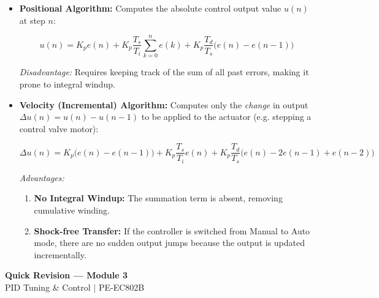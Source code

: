 \documentclass[12pt,a4paper]{article}
\begin{document}
\begin{itemize}[leftmargin=*, itemsep=2.5pt]
  \item \textbf{Positional Algorithm:} Computes the absolute control output value $u(n)$ at step $n$:
  \begin{tcolorbox}[formulabox, title={\textbf{Positional Digital PID}}]
  \[
  u(n) = K_p e(n) + K_p \frac{T_s}{T_i} \sum_{k=0}^n e(k) + K_p \frac{T_d}{T_s} \big( e(n) - e(n-1) \big)
  \]
  \end{tcolorbox}
  \textit{Disadvantage:} Requires keeping track of the sum of all past errors, making it prone to integral windup.
  
  \item \textbf{Velocity (Incremental) Algorithm:} Computes only the \textit{change} in output $\Delta u(n) = u(n) - u(n-1)$ to be applied to the actuator (e.g. stepping a control valve motor):
  \begin{tcolorbox}[formulabox, title={\textbf{Velocity Digital PID}}]
  \[
  \Delta u(n) = K_p \big( e(n) - e(n-1) \big) + K_p \frac{T_s}{T_i} e(n) + K_p \frac{T_d}{T_s} \big( e(n) - 2e(n-1) + e(n-2) \big)
  \]
  \end{tcolorbox}
  \textit{Advantages:}
  \begin{enumerate}[label=\textbf{\arabic*.}, leftmargin=*]
    \item \textbf{No Integral Windup:} The summation term is absent, removing cumulative winding.
    \item \textbf{Shock-free Transfer:} If the controller is switched from Manual to Auto mode, there are no sudden output jumps because the output is updated incrementally.
  \end{enumerate}
\end{itemize}

\newpage

\begin{center}
  {\large\bfseries\color{myred} Quick Revision --- Module 3}\\[3pt]
  {\small\color{mydark} PID Tuning \& Control $|$ PE-EC802B}
\end{center}
\noindent{\color{myred}\rule{\linewidth}{1.2pt}}
\vspace{4pt}
\end{document}
